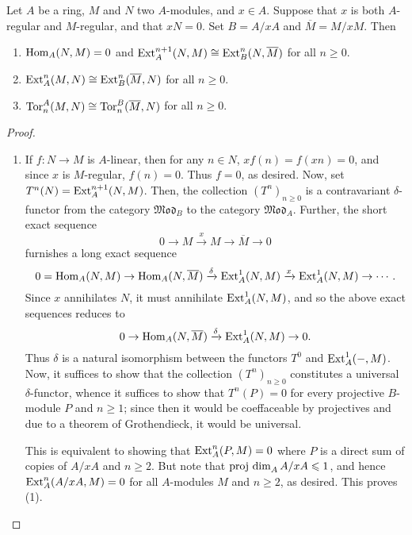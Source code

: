 \begin{lemma}
    Let $A$ be a ring, $M$ and $N$ two $A$-modules, and $x\in A$. Suppose that $x$ is both $A$-regular and $M$-regular, and that $xN = 0$. Set $B = A/xA$ and $\overline M = M/xM$. Then 
    \begin{enumerate}[label=(\arabic*)]
        \item $\operatorname{Hom}_A(N, M) = 0$ and $\operatorname{Ext}_A^{n + 1}(N, M)\cong\operatorname{Ext}^n_B(N, \overline M)$ for all $n\ge 0$.
        \item $\operatorname{Ext}^n_A(M, N)\cong\operatorname{Ext}^n_B(\overline M, N)$ for all $n\ge 0$.
        \item $\operatorname{Tor}^A_n(M, N)\cong\operatorname{Tor}^B_n(\overline M, N)$ for all $n\ge 0$.
    \end{enumerate}
\end{lemma}
\begin{proof}
\begin{enumerate}[label=(\arabic*)]
\item If $f: N\to M$ is $A$-linear, then for any $n\in N$, $xf(n) = f(xn) = 0$, and since $x$ is $M$-regular, $f(n) = 0$. Thus $f = 0$, as desired. Now, set $T^n(N) = \operatorname{Ext}^{n + 1}_A(N, M)$. Then, the collection $(T^n)_{n\ge 0}$ is a contravariant $\delta$-functor from the category $\mathfrak{Mod}_B$ to the category $\mathfrak{Mod}_A$. Further, the short exact sequence 
\begin{equation*}
    0\to M\xrightarrow x M\to\overline M\to 0
\end{equation*}
furnishes a long exact sequence 
\begin{equation*}
    0 = \operatorname{Hom}_A(N, M)\to \operatorname{Hom}_A(N,\overline M)\xrightarrow\delta\operatorname{Ext}^1_A(N, M)\xrightarrow x\operatorname{Ext}^1_A(N, M)\to\cdots.
\end{equation*}
Since $x$ annihilates $N$, it must annihilate $\operatorname{Ext}^1_A(N, M)$, and so the above exact sequences reduces to 
\begin{equation*}
    0\to\operatorname{Hom}_A(N,\overline M)\xrightarrow{\delta}\operatorname{Ext}^1_A(N, M)\to 0.
\end{equation*}
Thus $\delta$ is a natural isomorphism between the functors $T^0$ and $\operatorname{Ext}^1_A(-, M)$. Now, it suffices to show that the collection $(T^n)_{n\ge 0}$ constitutes a universal $\delta$-functor, whence it suffices to show that $T^n(P) = 0$ for every projective $B$-module $P$ and $n\ge 1$; since then it would be coeffaceable by projectives and due to a theorem of Grothendieck, it would be universal. 

This is equivalent to showing that $\operatorname{Ext}^n_A(P, M) = 0$ where $P$ is a direct sum of copies of $A/xA$ and $n\ge 2$. But note that $\operatorname{proj~dim}_A A/xA\leqslant 1$, and hence $\operatorname{Ext}^n_A(A/xA, M) = 0$ for all $A$-modules $M$ and $n\ge 2$, as desired. This proves (1).


\end{enumerate}
\end{proof}
